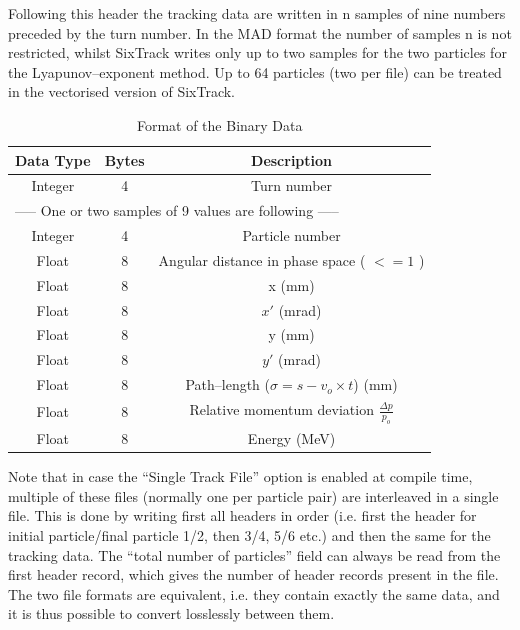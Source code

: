 \documentclass[a4paper,11pt]{report}
\begin{document}
\clearpage

Following this header the tracking data are written in n samples of
nine numbers preceded by the turn number. In the MAD format the number
of samples n is not restricted, whilst SixTrack writes only up to two
samples for the two particles for the Lyapunov--exponent method. Up to
64 particles (two per file) can be treated in the vectorised version
of SixTrack\@.

\begin{table}[h]
\caption{Format of the Binary Data}
\label{T-FBD}
\centering
\begin{tabular}{|c|c|c|}
  \hline
  {\bf Data Type} & {\bf Bytes} & {\bf Description} \\
  \hline
  Integer & 4 & Turn number \\
  \hline \multicolumn{3}{|l|}{----- One or two samples of 9 values are
    following -----}
  \\
  \hline
  Integer & 4 & Particle number \\
  \hline
  Float & 8 & Angular distance in phase space ( $ <= 1 $ ) \\
  \hline
  Float & 8 & x (mm) \\
  \hline
  Float & 8 & $x'$ (mrad)\\
  \hline
  Float & 8 & y (mm) \\
  \hline
  Float & 8 & $y'$ (mrad) \\
  \hline
  Float & 8 & Path--length ($\sigma = s - v_o \times t$) (mm) \\
  \hline Float & 8 & Relative momentum deviation \mbox{$ \frac{\Delta
      p}{p_o}
    $}\\
  \hline
  Float & 8 & Energy (MeV) \\
  \hline
\end{tabular}
\end{table}

Note that in case the ``Single Track File'' option is enabled at compile time, multiple of these files (normally one per particle pair) are interleaved in a single file.
This is done by writing first all headers in order (i.e. first the header for initial particle/final particle 1/2, then 3/4, 5/6 etc.) and then the same for the tracking data.
The ``total number of particles'' field can always be read from the first header record, which gives the number of header records present in the file.
The two file formats are equivalent, i.e. they contain exactly the same data, and it is thus possible to convert losslessly between them.
\end{document}
